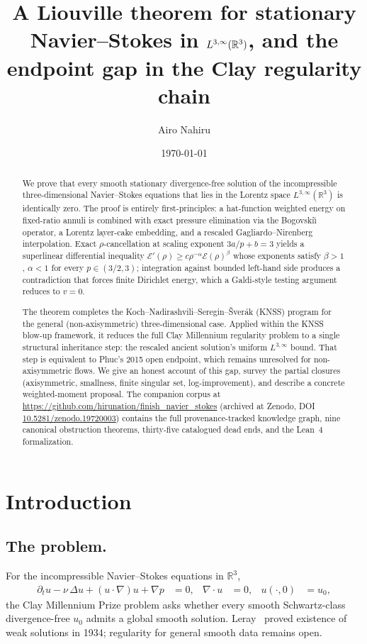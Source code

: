 \documentclass[11pt]{amsart}
\title{A Liouville theorem for stationary Navier--Stokes in $L^{3,\infty}(\RR^3)$, and the endpoint gap in the Clay regularity chain}
\author{Airo Nahiru}
\date{\today}
\theoremstyle{definition}
\newcommand{\RR}{\mathbb{R}}
\newcommand{\EE}{\mathcal{E}}    %
\begin{document}
\begin{abstract}
We prove that every smooth stationary divergence-free solution of
the incompressible three-dimensional Navier--Stokes equations that
lies in the Lorentz space $L^{3,\infty}(\RR^3)$ is identically
zero. The proof is entirely first-principles: a hat-function
weighted energy on fixed-ratio annuli is combined with exact
pressure elimination via the Bogovski\u{\i} operator, a Lorentz
layer-cake embedding, and a rescaled Gagliardo--Nirenberg
interpolation. Exact $\rho$-cancellation at scaling exponent
$3a/p + b = 3$ yields a superlinear differential inequality
$\EE'(\rho) \geq c\rho^{-\alpha}\EE(\rho)^\beta$ whose exponents
satisfy $\beta > 1$, $\alpha < 1$ for every $p \in (3/2, 3)$;
integration against bounded left-hand side produces a contradiction
that forces finite Dirichlet energy, which a Galdi-style testing
argument reduces to $v = 0$.

The theorem completes the Koch--Nadirashvili--Seregin--\v{S}ver\'ak
(KNSS) program for the general (non-axisymmetric) three-dimensional
case. Applied within the KNSS blow-up framework, it reduces the
full Clay Millennium regularity problem to a single structural
inheritance step: the rescaled ancient solution's uniform
$L^{3,\infty}$ bound. That step is equivalent to Phuc's 2015 open
endpoint, which remains unresolved for non-axisymmetric flows.
We give an honest account of this gap, survey the partial
closures (axisymmetric, smallness, finite singular set,
log-improvement), and describe a concrete weighted-moment
proposal. The companion corpus at
\url{https://github.com/hirunation/finish_navier_stokes} (archived at
Zenodo, DOI \href{https://doi.org/10.5281/zenodo.19720003}{10.5281/zenodo.19720003}) contains the full provenance-tracked
knowledge graph, nine canonical obstruction theorems, thirty-five
catalogued dead ends, and the Lean~4 formalization.
\end{abstract}

\maketitle

\tableofcontents

\section{Introduction}\label{sec:intro}

\subsection{The problem.}
For the incompressible Navier--Stokes equations in $\RR^3$,
\begin{align}\label{eq:NS}
\partial_t u - \nu\,\Delta u + (u \cdot \nabla) u + \nabla p &= 0,
& \nabla \cdot u &= 0, & u(\cdot, 0) &= u_0,
\end{align}
the Clay Millennium Prize problem asks whether every smooth
Schwartz-class divergence-free $u_0$ admits a global smooth
solution. Leray~\cite{Leray} proved existence of weak solutions
in 1934; regularity for general smooth data remains open.
\end{document}
